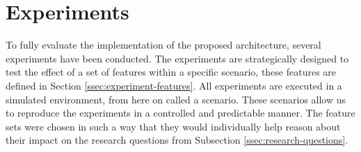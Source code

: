\section{Experiments}
\label{sec:experiments}
To fully evaluate the implementation of the proposed architecture, several experiments have been conducted. The experiments are strategically designed to test the effect of a set of features within a specific scenario, these features are defined in Section \ref{ssec:experiment-features}. All experiments are executed in a simulated environment, from here on called a scenario. These scenarios allow us to reproduce the experiments in a controlled and predictable manner. The feature sets were chosen in such a way that they would individually help reason about their impact on the research questions from Subsection \ref{ssec:research-questions}. 

        

